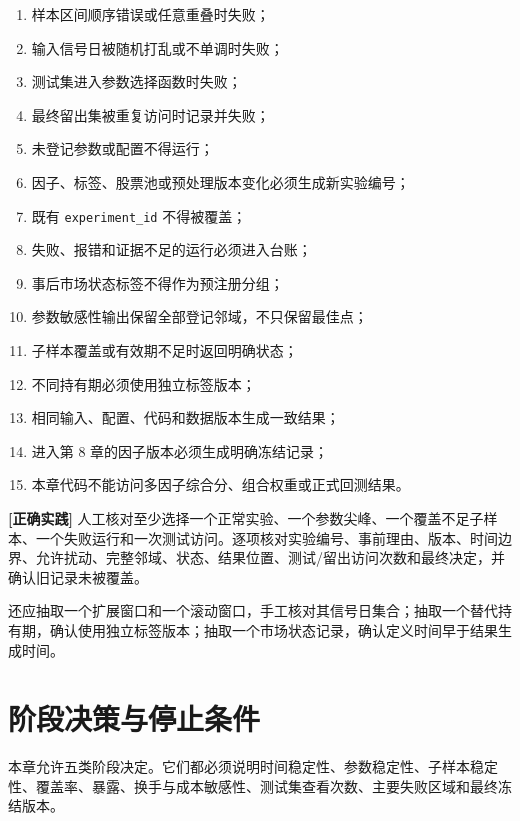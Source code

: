 \begin{enumerate}
  \item 样本区间顺序错误或任意重叠时失败；
  \item 输入信号日被随机打乱或不单调时失败；
  \item 测试集进入参数选择函数时失败；
  \item 最终留出集被重复访问时记录并失败；
  \item 未登记参数或配置不得运行；
  \item 因子、标签、股票池或预处理版本变化必须生成新实验编号；
  \item 既有 \texttt{experiment\_id} 不得被覆盖；
  \item 失败、报错和证据不足的运行必须进入台账；
  \item 事后市场状态标签不得作为预注册分组；
  \item 参数敏感性输出保留全部登记邻域，不只保留最佳点；
  \item 子样本覆盖或有效期不足时返回明确状态；
  \item 不同持有期必须使用独立标签版本；
  \item 相同输入、配置、代码和数据版本生成一致结果；
  \item 进入第 8 章的因子版本必须生成明确冻结记录；
  \item 本章代码不能访问多因子综合分、组合权重或正式回测结果。
\end{enumerate}

\begin{practicebox}
\textbf{[正确实践]} 人工核对至少选择一个正常实验、一个参数尖峰、一个覆盖不足子样本、一个失败运行和一次测试访问。逐项核对实验编号、事前理由、版本、时间边界、允许扰动、完整邻域、状态、结果位置、测试/留出访问次数和最终决定，并确认旧记录未被覆盖。
\end{practicebox}

还应抽取一个扩展窗口和一个滚动窗口，手工核对其信号日集合；抽取一个替代持有期，确认使用独立标签版本；抽取一个市场状态记录，确认定义时间早于结果生成时间。

\section{阶段决策与停止条件}

本章允许五类阶段决定。它们都必须说明时间稳定性、参数稳定性、子样本稳定性、覆盖率、暴露、换手与成本敏感性、测试集查看次数、主要失败区域和最终冻结版本。

